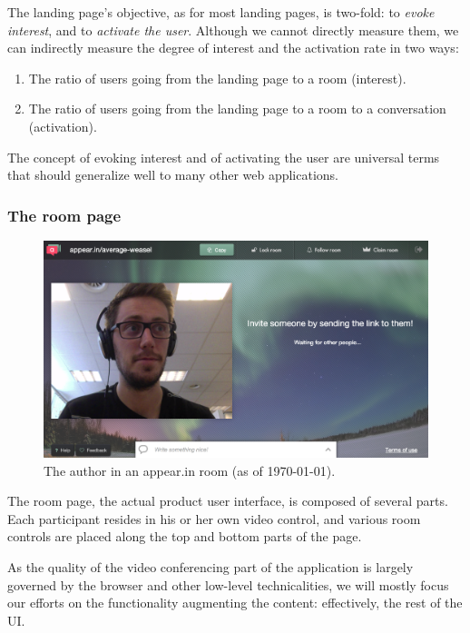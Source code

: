 The landing page's objective, as for most landing pages, is two-fold: to \emph{evoke interest}, and to \emph{activate the user}. Although we cannot directly measure them, we can indirectly measure the degree of interest and the activation rate in two ways:

\begin{enumerate}
  \item The ratio of users going from the landing page to a room (interest).
  \item The ratio of users going from the landing page to a room to a conversation (activation).
\end{enumerate}

The concept of evoking interest and of activating the user are universal terms that should generalize well to many other web applications.

\subsubsection{The room page}

\begin{figure}[t]
  \centering
    \includegraphics[width=\textwidth]{Figures/screenshots/appearin/in-room}
    \caption{The author in an appear.in room (as of \today).}
    \label{fig:appearin-room}
\end{figure}

The room page, the actual product user interface, is composed of several parts. Each participant resides in his or her own video control, and various room controls are placed along the top and bottom parts of the page.

As the quality of the video conferencing part of the application is largely governed by the browser and other low-level technicalities, we will mostly focus our efforts on the functionality augmenting the content: effectively, the rest of the UI.

